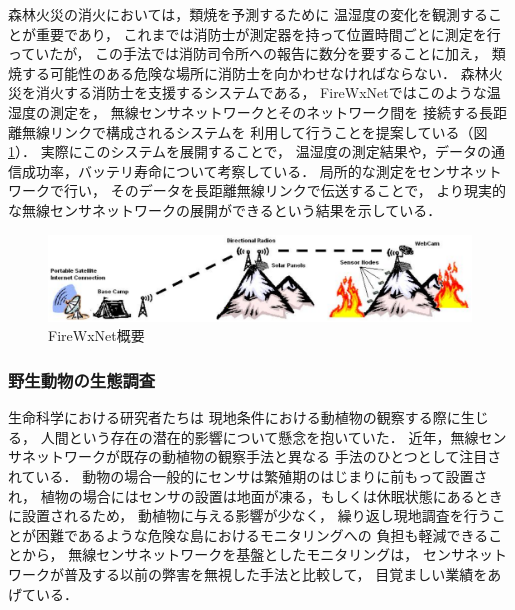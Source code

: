 森林火災の消火においては，類焼を予測するために
温湿度の変化を観測することが重要であり，
これまでは消防士が測定器を持って位置時間ごとに測定を行っていたが，
この手法では消防司令所への報告に数分を要することに加え，
類焼する可能性のある危険な場所に消防士を向かわせなければならない．
森林火災を消火する消防士を支援するシステムである，
FireWxNet\cite{conf/mobisys/HartungHSH06}ではこのような温湿度の測定を，
無線センサネットワークとそのネットワーク間を
接続する長距離無線リンクで構成されるシステムを
利用して行うことを提案している（図\ref{fig:firewxnet_overview}）．
実際にこのシステムを展開することで，
温湿度の測定結果や，データの通信成功率，バッテリ寿命について考察している．
局所的な測定をセンサネットワークで行い，
そのデータを長距離無線リンクで伝送することで，
より現実的な無線センサネットワークの展開ができるという結果を示している．

\begin{figure}[htbp]
 \begin{center}
  \includegraphics[width=140mm]{./images/firewxnet_overview.eps}
 \end{center}
 \caption{FireWxNet概要}
 \label{fig:firewxnet_overview}
\end{figure}




\subsubsection{野生動物の生態調査}

\vspace{0.5em}生命科学における研究者たちは
現地条件における動植物の観察する際に生じる，
人間という存在の潜在的影響について懸念を抱いていた．
近年，無線センサネットワークが既存の動植物の観察手法と異なる
手法のひとつとして注目されている．
動物の場合一般的にセンサは繁殖期のはじまりに前もって設置され，
植物の場合にはセンサの設置は地面が凍る，もしくは休眠状態にあるときに設置されるため，
動植物に与える影響が少なく，
繰り返し現地調査を行うことが困難であるような危険な島におけるモニタリングへの
負担も軽減できることから，
無線センサネットワークを基盤としたモニタリングは，
センサネットワークが普及する以前の弊害を無視した手法と比較して，
目覚ましい業績をあげている．

